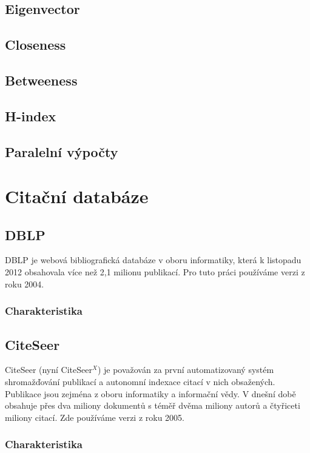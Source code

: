 \documentclass[12pt,titlepage]{report}
\begin{document}
\subsection{Eigenvector}
\subsection{Closeness}
\subsection{Betweeness}
\subsection{H-index}

\subsection{Paralelní výpočty}

\section{Citační databáze}
\subsection{DBLP}
DBLP \cite{DBLP} je webová bibliografická databáze v oboru informatiky,
která k listopadu 2012 obsahovala více než 2,1 milionu publikací. Pro tuto
práci používáme verzi z roku 2004.

\subsubsection{Charakteristika}

\subsection{CiteSeer}
CiteSeer (nyní CiteSeer$^X$) \cite{citeseer} je považován za první
automatizovaný systém shromažďování publikací a autonomní indexace citací v
nich obsažených. Publikace jsou zejména z oboru informatiky a informační vědy.
V dnešní době obsahuje přes dva miliony dokumentů s téměř dvěma miliony autorů
a čtyřiceti miliony citací. Zde používáme verzi z roku 2005.

\subsubsection{Charakteristika}
\end{document}
